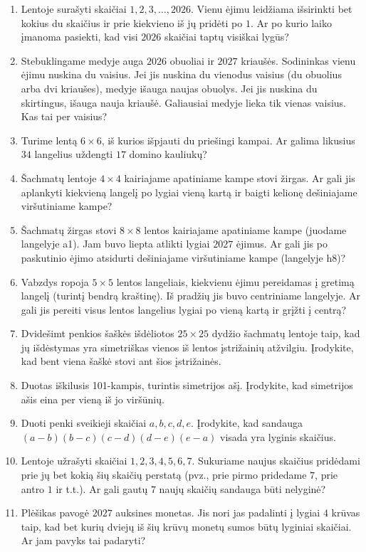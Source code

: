 \documentclass[11pt,a4paper]{scrartcl}
\begin{document}
\begin{enumerate}
    \item Lentoje surašyti skaičiai $1, 2, 3, \ldots, 2026$. Vienu ėjimu leidžiama išsirinkti bet kokius du skaičius ir prie kiekvieno iš jų pridėti po $1$. Ar po kurio laiko įmanoma pasiekti, kad visi $2026$ skaičiai taptų visiškai lygūs?
    \item Stebuklingame medyje auga $2026$ obuoliai ir $2027$ kriaušės. Sodininkas vienu ėjimu nuskina du vaisius. Jei jis nuskina du vienodus vaisius (du obuolius arba dvi kriaušes), medyje išauga naujas obuolys. Jei jis nuskina du skirtingus, išauga nauja kriaušė. Galiausiai medyje lieka tik vienas vaisius. Kas tai per vaisius?
    \item Turime lentą $6 \times 6$, iš kurios išpjauti du priešingi kampai. Ar galima likusius $34$ langelius uždengti $17$ domino kauliukų?
    \item Šachmatų lentoje $4 \times 4$ kairiajame apatiniame kampe stovi žirgas. Ar gali jis aplankyti kiekvieną langelį po lygiai vieną kartą ir baigti kelionę dešiniajame viršutiniame kampe?
    \item Šachmatų žirgas stovi $8 \times 8$ lentos kairiajame apatiniame kampe (juodame langelyje a1). Jam buvo liepta atlikti lygiai $2027$ ėjimus. Ar gali jis po paskutinio ėjimo atsidurti dešiniajame viršutiniame kampe (langelyje h8)?
    \item Vabzdys ropoja $5 \times 5$ lentos langeliais, kiekvienu ėjimu pereidamas į gretimą langelį (turintį bendrą kraštinę). Iš pradžių jis buvo centriniame langelyje. Ar gali jis pereiti visus lentos langelius lygiai po vieną kartą ir grįžti į centrą?
    \item Dvidešimt penkios šaškės išdėliotos $25 \times 25$ dydžio šachmatų lentoje taip, kad jų išdėstymas yra simetriškas vienos iš lentos įstrižainių atžvilgiu. Įrodykite, kad bent viena šaškė stovi ant šios įstrižainės.
    \item Duotas iškilusis 101-kampis, turintis simetrijos ašį. Įrodykite, kad simetrijos ašis eina per vieną iš jo viršūnių.
    \item Duoti penki sveikieji skaičiai $a, b, c, d, e$. Įrodykite, kad sandauga $(a-b)(b-c)(c-d)(d-e)(e-a)$ visada yra lyginis skaičius.
    \item Lentoje užrašyti skaičiai $1, 2, 3, 4, 5, 6, 7$. Sukuriame naujus skaičius pridėdami prie jų bet kokią šių skaičių perstatą (pvz., prie pirmo pridedame $7$, prie antro $1$ ir t.t.). Ar gali gautų $7$ naujų skaičių sandauga būti nelyginė?
    \item Plėšikas pavogė $2027$ auksines monetas. Jis nori jas padalinti į lygiai $4$ krūvas taip, kad bet kurių dviejų iš šių krūvų monetų sumos būtų lyginiai skaičiai. Ar jam pavyks tai padaryti?

\end{enumerate}
\end{document}
